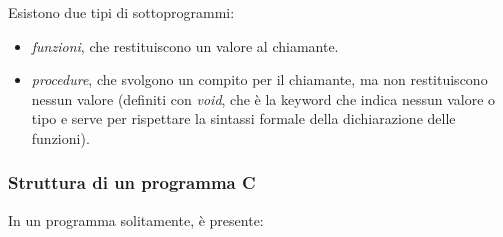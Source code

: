 \documentclass[
  paper=a4,
  oneside  ,captions=tableheading
]{scrbook}
\begin{document}
Esistono due tipi di sottoprogrammi:

\begin{itemize}
\item
  \emph{funzioni}, che restituiscono un valore al chiamante.
\item
  \emph{procedure}, che svolgono un compito per il chiamante, ma non
  restituiscono nessun valore (definiti con \emph{void}, che è la
  keyword che indica nessun valore o tipo e serve per rispettare la
  sintassi formale della dichiarazione delle funzioni).
\end{itemize}

\hypertarget{struttura-di-un-programma-c}{%
\subsubsection{Struttura di un programma
C}\label{struttura-di-un-programma-c}}

In un programma solitamente, è presente:
\end{document}
